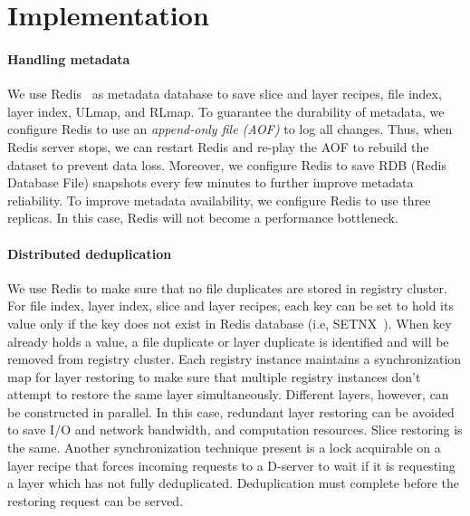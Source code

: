 \section{Implementation}
\label{sec:impl}

\paragraph{Handling metadata}
We use Redis~\cite{redis} as metadata database to save slice and layer recipes, file index, layer index, ULmap, and RLmap.
To guarantee the durability of metadata, 
we configure Redis to use an \emph{append-only file (AOF)} to log all changes.
Thus, when Redis server stops, we can restart Redis and re-play the AOF to rebuild the dataset to prevent data loss.
Moreover, we configure Redis to save RDB (Redis Database File) snapshots every few minutes to further improve metadata reliability. 
To improve metadata availability, 
we configure Redis to use three replicas.
In this case, Redis will not become a performance bottleneck.

\paragraph{Distributed deduplication}
We use Redis to make sure that no file duplicates are stored in registry cluster.
For file index, layer index, slice and layer recipes, each key can be set to hold its value only if the key does not exist in Redis database (i.e, SETNX~\cite{SETNX}).
When key already holds a value, a file duplicate or layer duplicate is identified and will be removed from registry cluster. Each registry instance maintains a synchronization map for layer restoring to make sure that multiple registry instances don't attempt to restore the same layer simultaneously.
 Different layers, however, can be constructed in parallel. 
 In this case, redundant layer restoring can be avoided to save I/O and network bandwidth, and computation resources.
 Slice restoring is the same. Another synchronization technique present is a lock acquirable on a layer recipe that forces incoming requests to a D-server to wait if it is requesting a layer which has not fully deduplicated. Deduplication must complete before the restoring request can be served.
 

